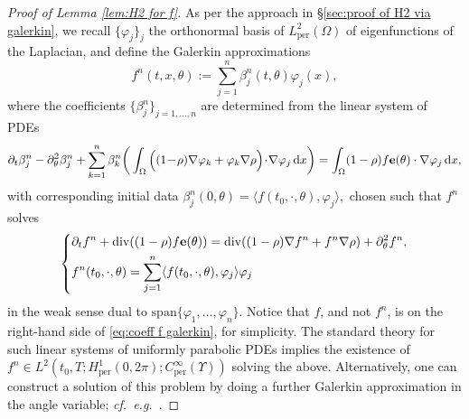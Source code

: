 \documentclass[11pt,a4paper,reqno]{amsart}
\theoremstyle{remark}
\theoremstyle{definition}
\numberwithin{equation}{section}
\newcommand{\per}{\mathrm{per}}
\DeclareMathOperator{\dv}{div}
\newcommand{\e}{{\bf e}}
\renewcommand{\d}{\, \mathrm{d} }
\begin{document}
\begin{proof}[Proof of Lemma \ref{lem:H2 for f}]

As per the approach in \S \ref{sec:proof of H2 via galerkin}, we recall $\{\varphi_j\}_j$ the orthonormal basis of $L^2_\per(\Omega)$ of eigenfunctions of the Laplacian, and define the Galerkin approximations 
\begin{equation*}
    f^n(t,x,\theta) := \sum^n_{j=1} \beta^n_j(t,\theta) \varphi_j(x), 
\end{equation*}
where the coefficients $\{\beta^n_j\}_{j=1,\dots,n}$ are determined from the linear system of PDEs 
\begin{equation}\label{eq:coeff f galerkin}
    \partial_t \beta^n_j - \partial^2_\theta \beta^n_j + \sum_{k=1}^n \beta^n_k\bigg( \int_\Omega \Big( (1\!-\!\rho) \nabla \varphi_k + \varphi_k\nabla\rho\Big) \!\cdot\! \nabla \varphi_j  \d x \bigg) = \int_\Omega  (1-\rho) f \e(\theta) \cdot \nabla \varphi_j \d x, 
\end{equation}
with corresponding initial data $\beta^n_j(0,\theta) = \langle f(t_0,\cdot,\theta) , \varphi_j \rangle, $ chosen such that $f^n$ solves 
\begin{equation}\label{eq:galerkin f}
    \left\lbrace\begin{aligned}
        &\partial_t f^n + \dv((1-\rho)f \e(\theta)) = \dv((1-\rho)\nabla f^n + f^n \nabla \rho ) + \partial^2_\theta f^n, \\ 
        &f^n(t_0,\cdot,\theta) = \sum_{j=1}^n \langle f(t_0,\cdot,\theta) , \varphi_j \rangle \varphi_j 
    \end{aligned}\right.
\end{equation}
in the weak sense dual to $\mathrm{span}\{\varphi_1,\dots,\varphi_n\}$. Notice that $f$, and not $f^n$, is on the right-hand side of \eqref{eq:coeff f galerkin}, for simplicity. The standard theory for such linear systems of uniformly parabolic PDEs implies the existence of $f^n \in L^2(t_0,T;H^1_\per(0,2\pi);C^\infty_\per(\Upsilon))$ solving the above. Alternatively, one can construct a solution of this problem by doing a further Galerkin approximation in the angle variable; \textit{cf.}~\textit{e.g.}~\cite[Appendix A]{bbes analysis}. 


\end{proof}
\end{document}
